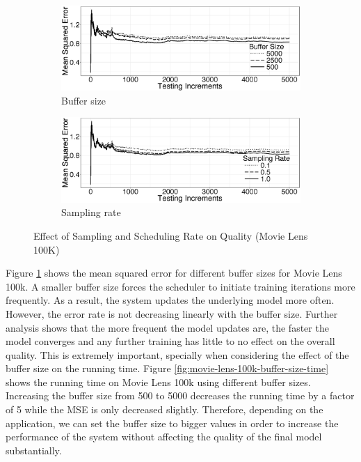 \documentclass[10pt,conference,letterpaper]{IEEEtran}
\begin{document}
\begin{figure}[h]
\begin{subfigure}{\columnwidth}
\centering
\includegraphics[width=\columnwidth]{../images/experiment-results/movie-lens-buffer-quality-improved.eps}
\caption{Buffer size}
\label{fig:movie-lens-100k-buffer-size-mse}
\end{subfigure}
\begin{subfigure}{\columnwidth}
\centering
\includegraphics[width=\columnwidth]{../images/experiment-results/movie-lens-sampling-quality-improved.eps}
\caption{Sampling rate}
\label{fig:movie-lens-100k-sample-rate}
\end{subfigure}
\vspace{2mm}
\caption{Effect of Sampling and Scheduling Rate on Quality (Movie Lens 100K)}
\end{figure}

Figure \ref{fig:movie-lens-100k-buffer-size-mse} shows the mean squared error for different buffer sizes for Movie Lens 100k. 
A smaller buffer size forces the scheduler to initiate training iterations more frequently.
As a result, the system updates the underlying model more often.
However, the error rate is not decreasing linearly with the buffer size.
Further analysis shows that the more frequent the model updates are, the faster the model converges and any further training has little to no effect on the overall quality.
This is extremely important, specially when considering the effect of the buffer size on the running time.
Figure \ref{fig:movie-lens-100k-buffer-size-time} shows the running time on Movie Lens 100k using different buffer sizes. 
Increasing the buffer size from 500 to 5000 decreases the running time by a factor of 5 while the MSE is only decreased slightly.
Therefore, depending on the application, we can set the buffer size to bigger values in order to increase the performance of the system without affecting the quality of the final model substantially.
\end{document}
